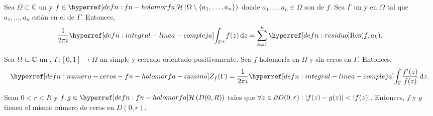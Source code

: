 \begin{teo}\label{teo:residuos}
    Sea $\Omega \subset \mathbb{C}$ un  y $f \in \exhyperref[defn:fn-holomorfa]{fn-holomorfa}{\mathcal{H}} \left(\Omega \setminus \{a_1, \dots, a_n\}\right)$ donde $a_1, \dots, a_n \in \Omega$ son  de $f$. Sea $\Gamma$ un   y  en $\Omega$ tal que $a_1, \dots, a_n$ están en el  de $\Gamma$. Entonces,
    \[
    \frac{1}{2\pi i} \exhyperref[defn:integral-linea-compleja]{integral-linea-compleja}{\int_{\Gamma^+}} f(z) \odif{z} = \sum_{k = 1}^{n} \exhyperref[defn:residuo]{residuo}{\operatorname{Res}}(f, a_k).
    \]
\end{teo}

\begin{teo}\label{teo:principio-argumento}
    Sea $\Omega \subset \mathbb{C}$ un , $\Gamma \colon [0, 1] \to \Omega$ un  simple y cerrado orientado positivamente. Sea $f$ holomorfa en $\Omega$ y sin ceros en $\Gamma$. Entonces,
    \[
    \exhyperref[defn:numero-ceros-fn-holomorfa-camino]{numero-ceros-fn-holomorfa-camino}{Z_f}(\Gamma) = \frac{1}{2\pi i} \exhyperref[defn:integral-linea-compleja]{integral-linea-compleja}{\int_{\Gamma}} \frac{f'(z)}{f(z)} \odif{z}.
    \]
\end{teo}

\begin{teo}[de Rouché]\label{teo:rouche}
    Sean $0 < r < R$ y $f, g \in \exhyperref[defn:fn-holomorfa]{fn-holomorfa}{\mathcal{H}} \left(D(0, R)\right)$ tales que $\forall z \in \partial D(0, r) : \left|f(z) - g(z)\right| < \left|f(z)\right|$. Entonces, $f$ y $g$ tienen el mismo número de ceros en $D(0, r)$.
\end{teo}